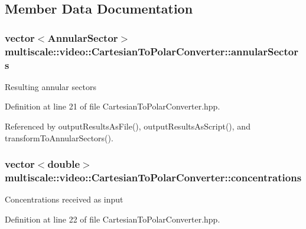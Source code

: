 \subsection{Member Data Documentation}
\hypertarget{classmultiscale_1_1video_1_1CartesianToPolarConverter_a3f8004ac5f8bae93c7a5e09bc37ba0ac}{
\subsubsection[{annular\-Sectors}]{\setlength{\rightskip}{0pt plus 5cm}vector$<${\bf Annular\-Sector}$>$ multiscale\-::video\-::\-Cartesian\-To\-Polar\-Converter\-::annular\-Sectors\hspace{0.3cm}{\ttfamily [private]}}}\label{classmultiscale_1_1video_1_1CartesianToPolarConverter_a3f8004ac5f8bae93c7a5e09bc37ba0ac}
Resulting annular sectors 

Definition at line 21 of file Cartesian\-To\-Polar\-Converter.\-hpp.



Referenced by output\-Results\-As\-File(), output\-Results\-As\-Script(), and transform\-To\-Annular\-Sectors().

\hypertarget{classmultiscale_1_1video_1_1CartesianToPolarConverter_a7356e201623f518132d75b7bc48407d3}{
\subsubsection[{concentrations}]{\setlength{\rightskip}{0pt plus 5cm}vector$<$double$>$ multiscale\-::video\-::\-Cartesian\-To\-Polar\-Converter\-::concentrations\hspace{0.3cm}{\ttfamily [private]}}}\label{classmultiscale_1_1video_1_1CartesianToPolarConverter_a7356e201623f518132d75b7bc48407d3}
Concentrations received as input 

Definition at line 22 of file Cartesian\-To\-Polar\-Converter.\-hpp.



